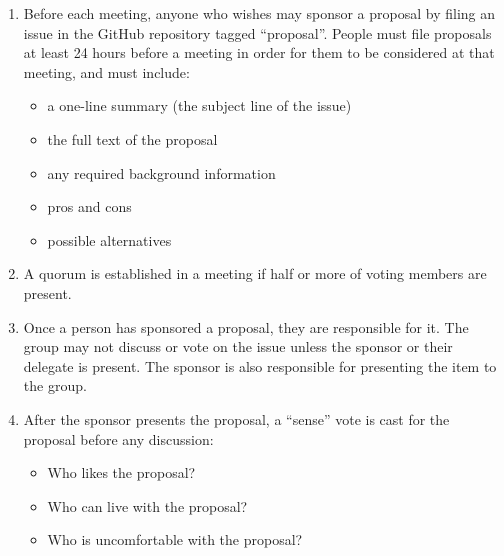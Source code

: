 \documentclass[krantzl]{krantz}
\begin{document}
\begin{enumerate}

\item 

Before each meeting, anyone who wishes may sponsor a proposal by filing an
    issue in the GitHub repository tagged “proposal”.  People must file proposals
    at least 24 hours before a meeting in order for them to be considered at that
    meeting, and must include:

\begin{itemize}

\item a one-line summary (the subject line of the issue)

\item the full text of the proposal

\item any required background information

\item pros and cons

\item possible alternatives

\end{itemize}



\item 

A quorum is established in a meeting if half or more of voting members are
    present.



\item 

Once a person has sponsored a proposal, they are responsible for it.  The
    group may not discuss or vote on the issue unless the sponsor or their
    delegate is present.  The sponsor is also responsible for presenting the
    item to the group.



\item 

After the sponsor presents the proposal, a “sense” vote is cast for the
    proposal before any discussion:

\begin{itemize}

\item Who likes the proposal?

\item Who can live with the proposal?

\item Who is uncomfortable with the proposal?


\end{itemize}
\end{enumerate}
\end{document}
